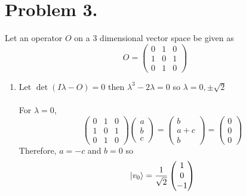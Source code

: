 \documentclass[12pt]{extarticle}
\begin{document}
 
\section*{Problem 3.}
Let an operator $O$ on a 3 dimensional vector space be given as 
\[
O =
  \begin{pmatrix}
    0 & 1 & 0 \\
    1 & 0 & 1 \\
    0 & 1 & 0
  \end{pmatrix}
\]

\begin{enumerate}
\item Let $\det{\left( I \lambda - O \right) } = 0$ then $\lambda^3 - 2 \lambda = 0$ so $\lambda = 0, \pm \sqrt{2}$ \\ \\ For $\lambda = 0$, 
\[
  \begin{pmatrix}
    0 & 1 & 0 \\
    1 & 0 & 1 \\
    0 & 1 & 0
  \end{pmatrix}
  \begin{pmatrix}
	a \\
	b \\
	c
  \end{pmatrix}
  = 
  \begin{pmatrix}
	b \\
	a + c \\
	b
  \end{pmatrix}
  =
  \begin{pmatrix}
	0 \\
	0 \\
	0
  \end{pmatrix}
\] 
Therefore, $a = -c$ and $b = 0$ so 
\[ \left| v_0 \right> = \frac{1}{\sqrt{2}} 
  \begin{pmatrix}
	1 \\
	0 \\
	-1
  \end{pmatrix}
\]


\end{enumerate}
\end{document}

